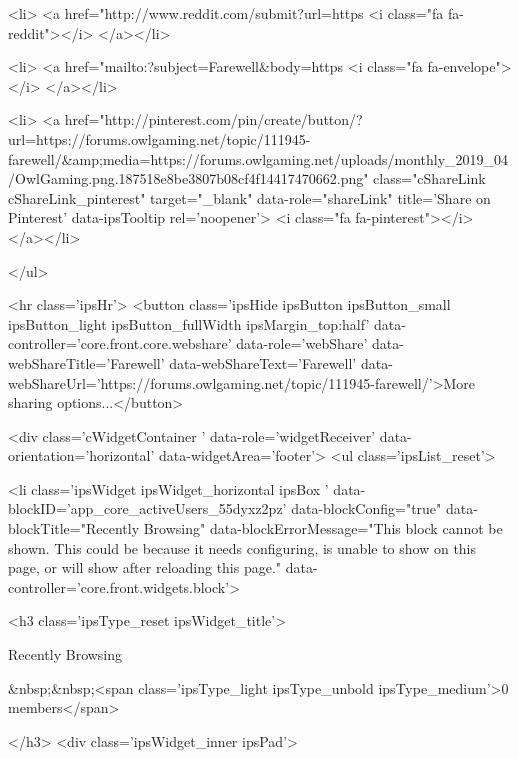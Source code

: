 			<li>
<a href="http://www.reddit.com/submit?url=https%
	<i class="fa fa-reddit"></i>
</a></li>
		
			<li>
<a href="mailto:?subject=Farewell&body=https%
	<i class="fa fa-envelope"></i>
</a></li>
		
			<li>
<a href="http://pinterest.com/pin/create/button/?url=https://forums.owlgaming.net/topic/111945-farewell/&amp;media=https://forums.owlgaming.net/uploads/monthly_2019_04/OwlGaming.png.187518e8be3807b08cf4f14417470662.png" class="cShareLink cShareLink_pinterest" target="_blank" data-role="shareLink" title='Share on Pinterest' data-ipsTooltip rel='noopener'>
	<i class="fa fa-pinterest"></i>
</a></li>
		
	</ul>


	<hr class='ipsHr'>
	<button class='ipsHide ipsButton ipsButton_small ipsButton_light ipsButton_fullWidth ipsMargin_top:half' data-controller='core.front.core.webshare' data-role='webShare' data-webShareTitle='Farewell' data-webShareText='Farewell' data-webShareUrl='https://forums.owlgaming.net/topic/111945-farewell/'>More sharing options...</button>




								


	<div class='cWidgetContainer '  data-role='widgetReceiver' data-orientation='horizontal' data-widgetArea='footer'>
		<ul class='ipsList_reset'>
			
				
					
					<li class='ipsWidget ipsWidget_horizontal ipsBox  ' data-blockID='app_core_activeUsers_55dyxz2pz' data-blockConfig="true" data-blockTitle="Recently Browsing" data-blockErrorMessage="This block cannot be shown. This could be because it needs configuring, is unable to show on this page, or will show after reloading this page."  data-controller='core.front.widgets.block'>

<h3 class='ipsType_reset ipsWidget_title'>
	
		Recently Browsing
	
	
		&nbsp;&nbsp;<span class='ipsType_light ipsType_unbold ipsType_medium'>0 members</span>
	
</h3>
<div class='ipsWidget_inner ipsPad'>
	
